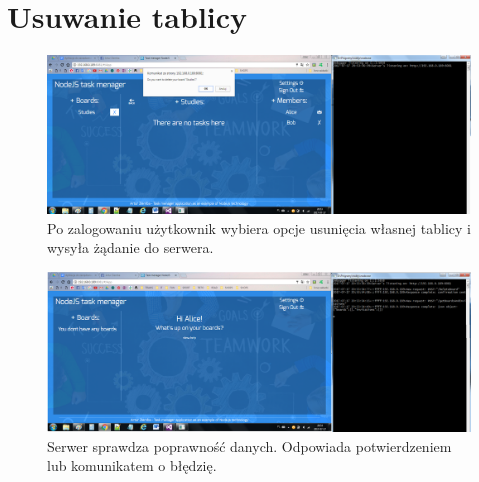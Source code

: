 \documentclass[12pt]{report}
\begin{document}
\section{Usuwanie tablicy}
\begin{figure}[!hb]
\centering
\includegraphics[width=\textwidth,height=\textheight,keepaspectratio]{E1.png}
\captionsetup{labelformat=empty}
\caption[]{Po zalogowaniu użytkownik wybiera opcje usunięcia własnej tablicy i wysyła żądanie do serwera.}
\end{figure}
\begin{figure}[!hb]
\centering
\includegraphics[width=\textwidth,height=\textheight,keepaspectratio]{E2.png}
\captionsetup{labelformat=empty}
\caption[]{Serwer sprawdza poprawność danych. Odpowiada potwierdzeniem lub komunikatem o błędzię.}
\end{figure}
\end{document}
